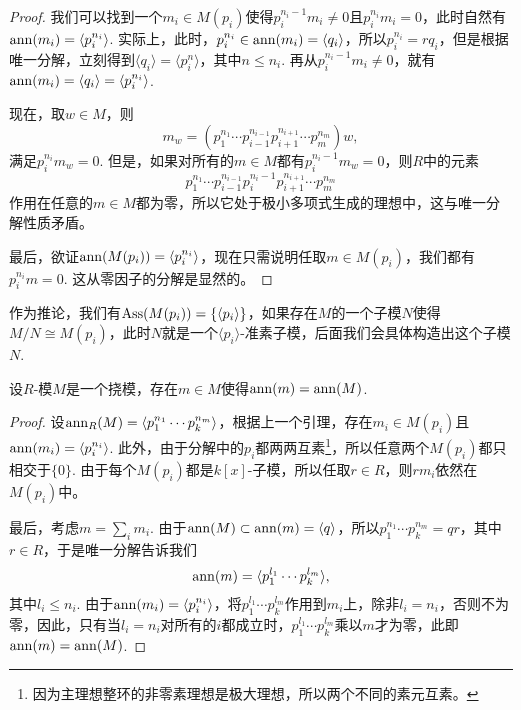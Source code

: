 \begin{proof}
    我们可以找到一个$m_i\in M(p_i)$使得$p_i^{n_i-1}m_i\neq 0$且$p_i^{n_i}m_i=0$，此时自然有$\operatorname{ann}(m_i)=\langle p_i^{n_i}\rangle$. 实际上，此时，$p_i^{n_i}\in \operatorname{ann}(m_i)=\langle q_i\rangle$，所以$p_i^{n_i}=rq_i$，但是根据唯一分解，立刻得到$\langle q_i\rangle=\langle p_i^n\rangle$，其中$n\leq n_i$. 再从$p_i^{n_i-1}m_i\neq 0$，就有$\operatorname{ann}(m_i)=\langle q_i\rangle = \langle p_i^{n_i}\rangle$.
    
    现在，取$w\in M$，则
    \[
        m_w=\left(p_1^{n_1}\cdots p_{i-1}^{n_{i-1}}p_{i+1}^{n_{i+1}}\cdots p_{m}^{n_{m}}\right)w,
    \]
    满足$p_i^{n_i}m_w=0$. 但是，如果对所有的$m\in M$都有$p_i^{n_i-1}m_w=0$，则$R$中的元素
    \[
        p_1^{n_1}\cdots p_{i-1}^{n_{i-1}}p_i^{n_i-1}p_{i+1}^{n_{i+1}}\cdots p_{m}^{n_{m}}
    \]
    作用在任意的$m\in M$都为零，所以它处于极小多项式生成的理想中，这与唯一分解性质矛盾。

    最后，欲证$\operatorname{ann}(M(p_i))=\langle p_i^{n_i}\rangle$，现在只需说明任取$m\in M(p_i)$，我们都有$p_i^{n_i}m=0$. 这从零因子的分解是显然的。
\end{proof}

作为推论，我们有$\operatorname{Ass}(M(p_i))=\{\langle p_i\rangle\}$，如果存在$M$的一个子模$N$使得$M/N\cong M(p_i)$，此时$N$就是一个$\langle p_i\rangle$-准素子模，后面我们会具体构造出这个子模$N$.

\begin{pro}
    设$R$-模$M$是一个挠模，存在$m\in M$使得$\operatorname{ann}(m)=\operatorname{ann}(M)$.
\end{pro}

\begin{proof}
    设$\operatorname{ann}_R(M)=\langle p_1^{n_1}\cdots p_k^{n_m}\rangle$，根据上一个引理，存在$m_i\in M(p_i)$且$\operatorname{ann}(m_i)=\langle p_i^{n_i}\rangle$. 此外，由于分解中的$p_i$都两两互素\footnote{因为主理想整环的非零素理想是极大理想，所以两个不同的素元互素。}，所以任意两个$M(p_i)$都只相交于$\{0\}$. 由于每个$M(p_i)$都是$k[x]$-子模，所以任取$r\in R$，则$rm_i$依然在$M(p_i)$中。

    最后，考虑$m=\sum_i m_i$. 由于$\operatorname{ann}(M)\subset \operatorname{ann}(m)=\langle q\rangle$，所以$p_1^{n_1}\cdots p_k^{n_m}=qr$，其中$r\in R$，于是唯一分解告诉我们
    \[
        \operatorname{ann}(m)=\langle p_1^{l_1}\cdots p_k^{l_m}\rangle,
    \]
    其中$l_i\leq n_i$. 由于$\operatorname{ann}(m_i)=\langle p_i^{n_i}\rangle$，将$p_1^{l_1}\cdots p_k^{l_m}$作用到$m_i$上，除非$l_i=n_i$，否则不为零，因此，只有当$l_i=n_i$对所有的$i$都成立时，$p_1^{l_1}\cdots p_k^{l_m}$乘以$m$才为零，此即$\operatorname{ann}(m)=\operatorname{ann}(M)$.
\end{proof}

